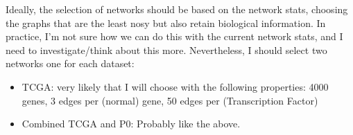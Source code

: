 Ideally, the selection of networks should be based on the network stats, choosing the graphs that are the least nosy but also retain biological information. In practice, I'm not sure how we can do this with the current network stats, and I need to investigate/think about this more. Nevertheless, I should select two networks one for each dataset:
\begin{itemize}
    \item TCGA: very likely that I will choose with the following properties: 4000 genes, 3 edges per (normal) gene, 50 edges per (Transcription Factor)
    \item Combined TCGA and P0: Probably like the above.
\end{itemize}